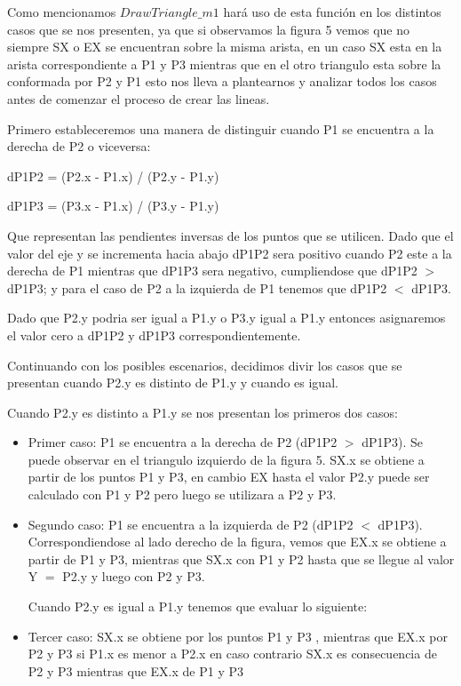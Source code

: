 \documentclass[a4paper]{article}
\begin{document}
Como mencionamos $DrawTriangle\_m1$ hará uso de esta función en los distintos casos que se nos presenten, ya que si observamos la figura 5 vemos que no siempre SX o EX se encuentran sobre la misma arista, en un caso SX esta en la arista correspondiente a P1 y P3 mientras que en el otro triangulo esta sobre la conformada por P2 y P1 esto nos lleva a plantearnos y analizar todos los casos antes de comenzar el proceso de crear las lineas.


Primero estableceremos una manera de distinguir cuando P1 se encuentra a la derecha de P2 o viceversa: 

dP1P2 = (P2.x - P1.x) / (P2.y - P1.y) 

dP1P3 = (P3.x - P1.x) / (P3.y - P1.y)


Que representan las pendientes inversas de los puntos que se utilicen. Dado que el valor del eje y se incrementa hacia abajo dP1P2 sera positivo cuando P2 este a la derecha de P1 mientras que dP1P3 sera negativo, cumpliendose que dP1P2 $>$ dP1P3; y para el caso de P2 a la izquierda de P1 tenemos que dP1P2 $<$ dP1P3. \par Dado que P2.y podria ser igual a P1.y o P3.y igual a P1.y entonces asignaremos el valor cero a dP1P2 y dP1P3 correspondientemente.



Continuando con los posibles escenarios, decidimos divir los casos que se presentan cuando P2.y es distinto de P1.y y cuando es igual.\newline
\par Cuando P2.y es distinto a P1.y se nos presentan los primeros dos casos:
 
\begin{itemize}
\item Primer caso: P1 se encuentra a la derecha de P2 (dP1P2 $>$ dP1P3). Se puede observar en el triangulo izquierdo de la figura 5. SX.x se obtiene a partir de los puntos P1 y P3, en cambio EX hasta el valor P2.y puede ser calculado con P1 y P2 pero luego se utilizara a P2 y P3.

\item Segundo caso: P1 se encuentra a la izquierda de P2 (dP1P2 $<$ dP1P3). Correspondiendose al lado derecho de la figura, vemos que EX.x se obtiene a partir de P1 y P3, mientras que SX.x con P1 y P2 hasta que se llegue al valor Y $=$ P2.y y luego con P2 y P3. 

Cuando P2.y es igual a P1.y tenemos que evaluar lo siguiente:

\item Tercer caso:  SX.x se obtiene por los puntos P1 y P3 , mientras que EX.x por P2 y P3 si P1.x es menor a P2.x en caso contrario SX.x es consecuencia de P2 y P3 mientras que EX.x de P1 y P3 


\end{itemize}
\end{document}
